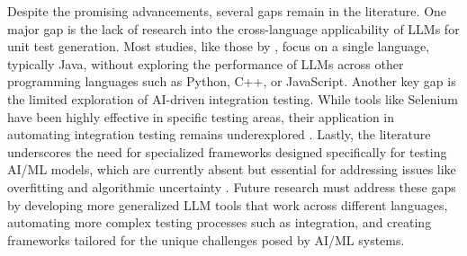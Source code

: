 \documentclass[12pt,a4paper]{article}
\begin{document}
Despite the promising advancements, several gaps remain in the literature. One major gap is the lack of research into the cross-language applicability of LLMs for unit test generation. Most studies, like those by \citep{Guilherme23}, focus on a single language, typically Java, without exploring the performance of LLMs across other programming languages such as Python, C++, or JavaScript. Another key gap is the limited exploration of AI-driven integration testing. While tools like Selenium have been highly effective in specific testing areas, their application in automating integration testing remains underexplored \citep{Minimol21}. Lastly, the literature underscores the need for specialized frameworks designed specifically for testing AI/ML models, which are currently absent but essential for addressing issues like overfitting and algorithmic uncertainty \citep{Kishore21}. Future research must address these gaps by developing more generalized LLM tools that work across different languages, automating more complex testing processes such as integration, and creating frameworks tailored for the unique challenges posed by AI/ML systems.



\end{document}
